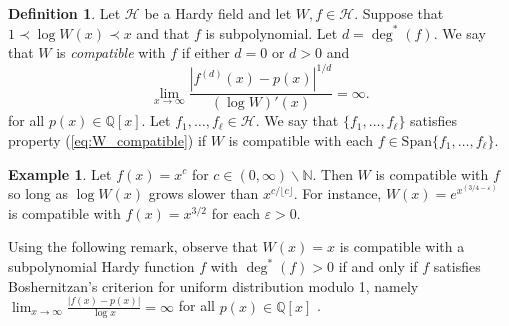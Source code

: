 \documentclass[12pt]{article}
\theoremstyle{plain} %
\theoremstyle{definition} %
\newtheorem{definition}[theorem]{Definition}
\newtheorem{example}[theorem]{Example}
\theoremstyle{plain}
\theoremstyle{plain}
\numberwithin{equation}{section}
\newcommand{\N}{\mathbb{N}}
\newcommand{\Q}{\mathbb{Q}}
\renewcommand{\epsilon}{\varepsilon}
\renewcommand{\setminus}{\backslash}
\newcommand{\1}{\mathbbm{1}}
\newcommand{\oo}{\infty}
\newcommand{\floor}[1]{\lfloor #1 \rfloor}
\begin{document}
 \begin{definition} \label{def:W_compatible}
 Let $\mathcal{H}$ be a Hardy field and let $W,f\in \mathcal{H}$. Suppose that $1\prec \log W(x)\prec x$ and that $f$ is subpolynomial. Let $d=\deg^*(f)$. We say that $W$ is \emph{compatible} with $f$ if either $d=0$ or $d>0$ and
 \begin{equation}\label{eq:W_compatible}
     \lim_{x\to\oo}\frac{|f^{(d)}(x)-p(x)|^{1/d}}{(\log W)'(x)}=\oo.\tag{$\star$}
 \end{equation}
for all $p(x)\in \Q[x]$. Let $f_1,\dots, f_{\ell}\in \mathcal{H}$. We say that $\{f_1,\dots, f_{\ell}\}$ satisfies property (\ref{eq:W_compatible}) if $W$ is compatible with each $f\in \text{Span}\{f_1,\dots, f_{\ell}\}$.
\end{definition}
\begin{example}
    Let $f(x) = x^c$ for $c\in (0,\oo)\setminus \N$. Then $W$ is compatible with $f$ so long as $\log W(x)$ grows slower than $x^{c/\floor{c}}$. For instance, $W(x) = e^{x^{(3/4-\epsilon)}}$ is compatible with $f(x)=x^{3/2}$ for each $\epsilon>0$.
\end{example}









Using the following remark, observe that $W(x)=x$ is compatible with a subpolynomial Hardy function $f$ with $\deg^*(f)>0$ if and only if $f$ satisfies Boshernitzan's criterion for uniform distribution modulo 1, namely $\lim_{x\to\oo}\frac{|f(x)-p(x)|}{\log x}= \oo$ for all $p(x)\in \Q[x]$
 \cite[Theorem 1.3]{Boshernitzan}.
\end{document}
